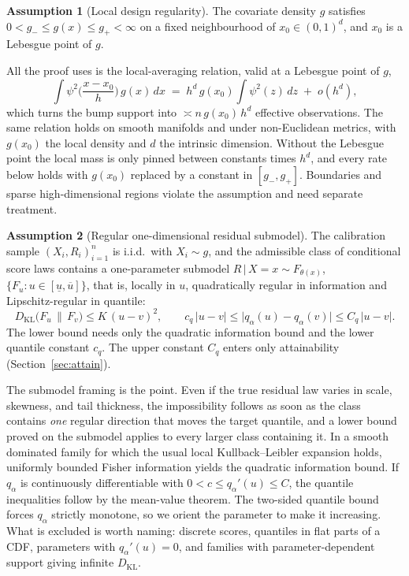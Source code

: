 \documentclass[11pt]{article}
\theoremstyle{definition}
\newtheorem{assumption}{Assumption}
\theoremstyle{remark}
\newcommand{\KL}{D_{\mathrm{KL}}}
\newcommand{\given}{\,|\,}
\begin{document}
\begin{assumption}[Local design regularity]\label{as:design}
The covariate density $g$ satisfies $0 < g_- \le g(x) \le g_+ < \infty$ on a fixed
neighbourhood of $x_0 \in (0,1)^d$, and $x_0$ is a Lebesgue point of $g$.
\end{assumption}

All the proof uses is the local-averaging relation, valid at a Lebesgue point of $g$,
\[
  \int \psi^2\!\Big(\frac{x-x_0}{h}\Big)\,g(x)\,dx
    \;=\; h^{d}\,g(x_0)\!\int\!\psi^2(z)\,dz \;+\; o(h^d),
\]
which turns the bump support into $\asymp n\,g(x_0)\,h^{d}$ effective observations. The same
relation holds on smooth manifolds and under non-Euclidean metrics, with $g(x_0)$ the local
density and $d$ the intrinsic dimension. Without the Lebesgue point the local mass is only
pinned between constants times $h^d$, and every rate below holds with $g(x_0)$ replaced by a
constant in $[g_-,g_+]$. Boundaries and sparse high-dimensional regions violate the
assumption and need separate treatment.

\begin{assumption}[Regular one-dimensional residual submodel]\label{as:family}
The calibration sample $(X_i,R_i)_{i=1}^n$ is i.i.d.\ with $X_i\sim g$, and the admissible
class of conditional score laws contains a one-parameter submodel
$R \given X=x \sim F_{\theta(x)}$, $\{F_u : u \in [\underline u, \overline u]\}$, that is,
locally in $u$, quadratically regular in information and Lipschitz-regular in quantile:
\[
  \KL\big(F_u \,\|\, F_v\big) \le K\,(u-v)^2,
  \qquad
  c_q\,|u-v| \le \big|q_\alpha(u) - q_\alpha(v)\big| \le C_q\,|u-v| .
\]
The lower bound needs only the quadratic information bound and the lower quantile constant
$c_q$. The upper constant $C_q$ enters only attainability (Section~\ref{sec:attain}).
\end{assumption}

The submodel framing is the point. Even if the true residual law varies in scale,
skewness, and tail thickness, the impossibility follows as soon as the class contains
\emph{one} regular direction that moves the target quantile, and a lower bound proved on
the submodel applies to every larger class containing it. In a smooth dominated family for
which the usual local Kullback--Leibler expansion holds, uniformly bounded Fisher
information yields the quadratic information bound. If $q_\alpha$ is continuously
differentiable with $0<c\le q_\alpha'(u)\le C$, the quantile inequalities follow by the
mean-value theorem. The two-sided quantile bound forces $q_\alpha$ strictly monotone, so we
orient the parameter to make it increasing. What is excluded is worth naming: discrete
scores, quantiles in flat parts of a CDF, parameters with $q_\alpha'(u)=0$, and families
with parameter-dependent support giving infinite $\KL$.
\end{document}
